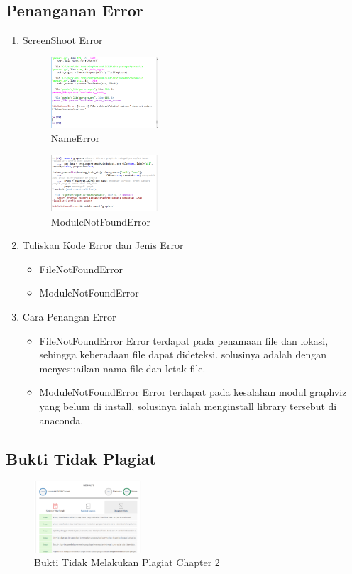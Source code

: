 \subsection{Penanganan Error}
\begin{enumerate}
	\item ScreenShoot Error
	\begin{figure}[H]
		\includegraphics[width=4cm]{figures/1174096/tugas2/error/error2.PNG}
		\centering
		\caption{NameError}
	\end{figure}
	\begin{figure}[H]
		\includegraphics[width=4cm]{figures/1174096/tugas2/error/error1.PNG}
		\centering
		\caption{ModuleNotFoundError}
	\end{figure}
	\item Tuliskan Kode Error dan Jenis Error
	\begin{itemize}
		\item FileNotFoundError
		\item ModuleNotFoundError
	\end{itemize}
	\item Cara Penangan Error
	\begin{itemize}
		\item FileNotFoundError
		\hfill\break
		Error terdapat pada penamaan file dan lokasi, sehingga keberadaan file dapat dideteksi. solusinya adalah dengan menyesuaikan nama file dan letak file.
		\item ModuleNotFoundError
		\hfill\break
		Error terdapat pada kesalahan modul graphviz yang belum di install, solusinya ialah menginstall library tersebut di anaconda.
	\end{itemize}
\end{enumerate}
\subsection{Bukti Tidak Plagiat}
\begin{figure}[H]
\centering
	\includegraphics[width=4cm]{figures/1174096/tugas2/bukti/1.PNG}

	\caption{Bukti Tidak Melakukan Plagiat Chapter 2}
\end{figure}

